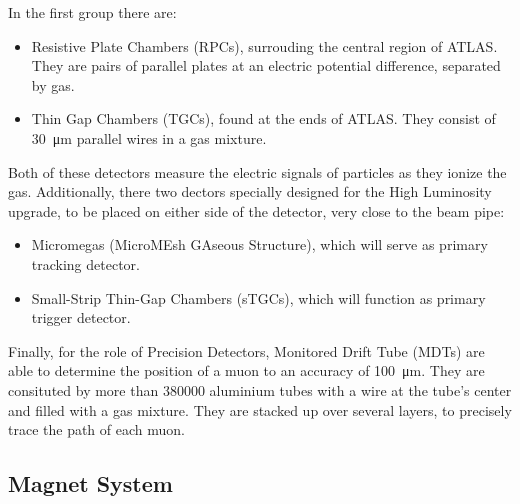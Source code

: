 In the first group there are: 
\begin{itemize}
    \item Resistive Plate Chambers (RPCs), surrouding the central region of ATLAS. They are pairs of parallel plates at an electric potential difference, separated by gas.
    \item Thin Gap Chambers (TGCs), found at the ends of ATLAS. They consist of \qty{30}{\micro\meter} parallel wires in a gas mixture.
\end{itemize}
Both of these detectors measure the electric signals of particles as they ionize the gas. Additionally, there two dectors\cite{KOULOURIS2020162757} specially designed for the High Luminosity upgrade, to be placed on either side of the detector, very close to the beam pipe:
\begin{itemize}
    \item Micromegas (MicroMEsh GAseous Structure), which will serve as primary tracking detector.
    \item Small-Strip Thin-Gap Chambers (sTGCs), which will function as primary trigger detector.
\end{itemize}

Finally, for the role of Precision Detectors, Monitored Drift Tube (MDTs) are able to determine the position of a muon to an accuracy of \qty{100}{\micro\meter}. They are consituted by more than \num{380000} aluminium tubes with a wire at the tube's center and filled with a gas mixture. They are stacked up over several layers, to precisely trace the path of each muon.


\subsection{Magnet System}\label{sec:magnet_system}

\begin{figure}[!ht]
    \centering
    \hfill
    \centering
\end{figure}

